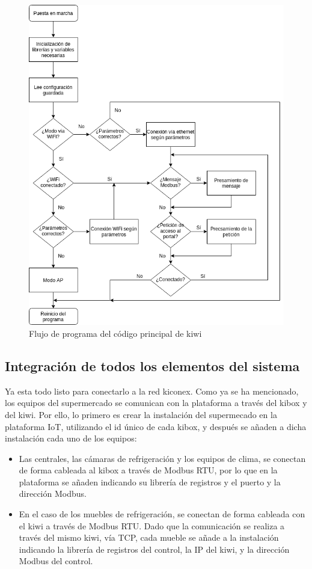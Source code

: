 \begin{figure}[H]
  \centering
  \includegraphics[width=15cm, keepaspectratio]{img/flujoProgramaPrincipal}
  \caption{Flujo de programa del código principal de kiwi}
  \label{figura:flujoProgramaPrincipal}
\end{figure}


\subsection{Integración de todos los elementos del sistema}
\label{subsec:integracionComponentes}

Ya esta todo listo para conectarlo a la red kiconex. Como ya se ha mencionado, los equipos del supermercado se comunican con la plataforma a través del kibox y del kiwi. Por ello, lo primero es crear la instalación del supermecado en la plataforma IoT, utilizando el id único de cada kibox, y después se añaden a dicha instalación cada uno de los equipos: 

\begin{itemize}
  \item Las centrales, las cámaras de refrigeración y los equipos de clima, se conectan de forma cableada al kibox a través de Modbus RTU, por lo que en la plataforma se añaden indicando su librería de registros y el puerto y la dirección Modbus.
  \item En el caso de los muebles de refrigeración, se conectan de forma cableada con el kiwi a través de Modbus RTU. Dado que la comunicación se realiza a través del mismo kiwi, vía TCP, cada mueble se añade a la instalación indicando la librería de registros del control, la IP del kiwi, y la dirección Modbus del control. 
\end{itemize}


